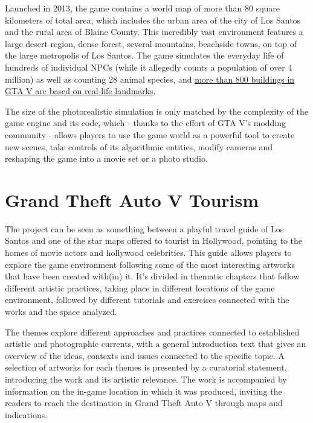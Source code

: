 \documentclass[
  openany]{book}
\begin{document}
Launched in 2013, the game contains a world map of more than 80 square kilometers of total area, which includes the urban area of the city of Los Santos and the rural area of Blaine County. This incredibly vast environment features a large desert region, dense forest, several mountains, beachside towns, on top of the large metropolis of Los Santos. The game simulates the everyday life of hundreds of individual NPCs (while it allegedly counts a population of over 4 million) as well as counting 28 animal species, and \href{https://grandtheftdata.com/landmarks/\#0,0,2,satellite}{more than 800 buildings in GTA V are based on real-life landmarks}.

The size of the photorealistic simulation is only matched by the complexity of the game engine and its code, which - thanks to the effort of GTA V's modding community - allows players to use the game world as a powerful tool to create new scenes, take controls of its algorithmic entities, modify cameras and reshaping the game into a movie set or a photo studio.

\hypertarget{grand-theft-auto-v-tourism}{%
\section*{Grand Theft Auto V Tourism}\label{grand-theft-auto-v-tourism}}

The project can be seen as something between a playful travel guide of Los Santos and one of the star maps offered to tourist in Hollywood, pointing to the homes of movie actors and hollywood celebrities. This guide allows players to explore the game environment following some of the most interesting artworks that have been created with(in) it. It's divided in thematic chapters that follow different artistic practices, taking place in different locations of the game environment, followed by different tutorials and exercises connected with the works and the space analyzed.

The themes explore different approaches and practices connected to established artistic and photographic currents, with a general introduction text that gives an overview of the ideas, contexts and issues connected to the specific topic. A selection of artworks for each themes is presented by a curatorial statement, introducing the work and its artistic relevance. The work is accompanied by information on the in-game location in which it was produced, inviting the readers to reach the destination in Grand Theft Auto V through maps and indications.
\end{document}
